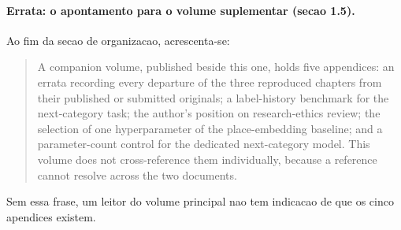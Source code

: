 %
%
%
%

\paragraph*{Errata: o apontamento para o volume suplementar (secao 1.5).}
Ao fim da secao de organizacao, acrescenta-se:

\begin{quote}
A companion volume, published beside this one, holds five appendices: an errata recording every
departure of the three reproduced chapters from their published or submitted originals; a
label-history benchmark for the next-category task; the author's position on research-ethics review;
the selection of one hyperparameter of the place-embedding baseline; and a parameter-count control
for the dedicated next-category model. This volume does not cross-reference them individually,
because a reference cannot resolve across the two documents.
\end{quote}

\noindent
Sem essa frase, um leitor do volume principal nao tem indicacao de que os cinco apendices existem.

